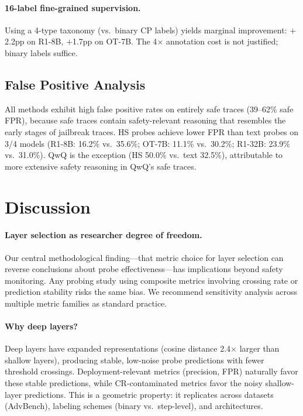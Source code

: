 \documentclass[11pt]{article}
\begin{document}
\paragraph{16-label fine-grained supervision.}
Using a 4-type taxonomy (vs.\ binary CP labels) yields marginal improvement: $+$2.2pp on R1-8B, $+$1.7pp on OT-7B.
The 4$\times$ annotation cost is not justified; binary labels suffice.


\subsection{False Positive Analysis}

All methods exhibit high false positive rates on entirely safe traces (39--62\% safe FPR), because safe traces contain safety-relevant reasoning that resembles the early stages of jailbreak traces.
HS probes achieve lower FPR than text probes on 3/4 models (R1-8B: 16.2\% vs.\ 35.6\%; OT-7B: 11.1\% vs.\ 30.2\%; R1-32B: 23.9\% vs.\ 31.0\%).
QwQ is the exception (HS 50.0\% vs.\ text 32.5\%), attributable to more extensive safety reasoning in QwQ's safe traces.


\section{Discussion}

\paragraph{Layer selection as researcher degree of freedom.}
Our central methodological finding---that metric choice for layer selection can reverse conclusions about probe effectiveness---has implications beyond safety monitoring.
Any probing study using composite metrics involving crossing rate or prediction stability risks the same bias.
We recommend sensitivity analysis across multiple metric families as standard practice.

\paragraph{Why deep layers?}
Deep layers have expanded representations (cosine distance 2.4$\times$ larger than shallow layers), producing stable, low-noise probe predictions with fewer threshold crossings.
Deployment-relevant metrics (precision, FPR) naturally favor these stable predictions, while CR-contaminated metrics favor the noisy shallow-layer predictions.
This is a geometric property: it replicates across datasets (AdvBench), labeling schemes (binary vs.\ step-level), and architectures.
\end{document}
